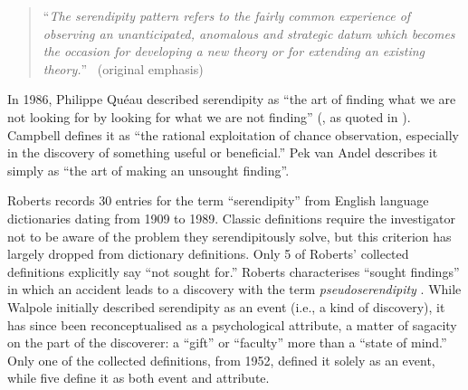 \begin{quote}
``\emph{The serendipity pattern refers to the fairly common experience of observing an \emph{unanticipated}, \emph{anomalous} \emph{and strategic} datum which becomes the occasion for developing a new theory or for extending an existing theory.}''~\cite[p. 506]{merton1948bearing} (original emphasis)
\end{quote}

In 1986, Philippe Qu\'eau described serendipity as ``the art of
finding what we are not looking for by looking for what we are not
finding'' (, as quoted in
).  Campbell
\citeyear{campbell2005serendipity} defines it as ``the rational
exploitation of chance observation, especially in the discovery of
something useful or beneficial.''  Pek van Andel
\citeyear[p. 631]{van1994anatomy} describes it simply as ``the art of
making an unsought finding''.


Roberts \citeyear[pp. 246--249]{roberts} records 30 entries for the term ``serendipity'' from English language dictionaries dating from 1909 to 1989.  
%
Classic definitions require the investigator not to be aware of the problem they serendipitously solve, but this criterion has largely dropped from dictionary definitions. Only 5 of Roberts' collected definitions explicitly say ``not sought for.''  Roberts characterises ``sought findings'' in which an accident leads to a discovery with the term \emph{pseudoserendipity} \cite{chumaceiro1995serendipity}.
%
While Walpole initially described serendipity as an event
(i.e., a kind of discovery), it has
since been reconceptualised as a psychological attribute, a matter of
sagacity on the part of the discoverer: a ``gift'' or ``faculty'' more
than a ``state of mind.''  Only one of the collected definitions, from
1952, defined it solely as an event, while five define it as both
event and attribute.

